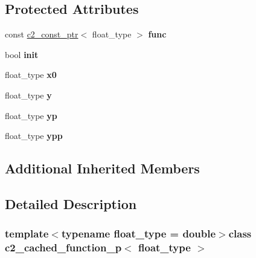 \subsection*{Protected Attributes}
\begin{DoxyCompactItemize}
\item 
\hypertarget{classc2__cached__function__p_a3918bce2ff2768a71256c5ef9346416e}{const \hyperlink{classc2__const__ptr}{c2\-\_\-const\-\_\-ptr}$<$ float\-\_\-type $>$ {\bfseries func}}\label{classc2__cached__function__p_a3918bce2ff2768a71256c5ef9346416e}

\item 
\hypertarget{classc2__cached__function__p_a67f6484e64960b65ae0f7127d72707ff}{bool {\bfseries init}}\label{classc2__cached__function__p_a67f6484e64960b65ae0f7127d72707ff}

\item 
\hypertarget{classc2__cached__function__p_a0dac26fccad111242068e3b43e387483}{float\-\_\-type {\bfseries x0}}\label{classc2__cached__function__p_a0dac26fccad111242068e3b43e387483}

\item 
\hypertarget{classc2__cached__function__p_a0104e340e54e7e0b7da2ac4ed5fce2a8}{float\-\_\-type {\bfseries y}}\label{classc2__cached__function__p_a0104e340e54e7e0b7da2ac4ed5fce2a8}

\item 
\hypertarget{classc2__cached__function__p_a5e6fa7f5df36abad202ae18c94555cf9}{float\-\_\-type {\bfseries yp}}\label{classc2__cached__function__p_a5e6fa7f5df36abad202ae18c94555cf9}

\item 
\hypertarget{classc2__cached__function__p_aa4c8bb8e2184ba1560aa3c63cb73095a}{float\-\_\-type {\bfseries ypp}}\label{classc2__cached__function__p_aa4c8bb8e2184ba1560aa3c63cb73095a}

\end{DoxyCompactItemize}
\subsection*{Additional Inherited Members}


\subsection{Detailed Description}
\subsubsection*{template$<$typename float\-\_\-type = double$>$class c2\-\_\-cached\-\_\-function\-\_\-p$<$ float\-\_\-type $>$}

